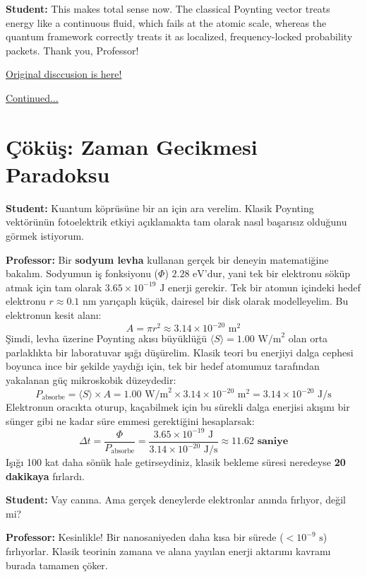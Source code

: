 \documentclass[11pt,a4paper]{article}
\newcommand{\Professor}{\noindent\textbf{\textcolor{profcolor}{Professor:}} }
\newcommand{\Student}{\noindent\textbf{\textcolor{studcolor}{Student:}} }
\begin{document}
	\Student This makes total sense now. The classical Poynting vector treats energy like a continuous fluid, which fails at the atomic scale, whereas the quantum framework correctly treats it as localized, frequency-locked probability packets. Thank you, Professor!
	
	\vspace{12pt}
	\href{https://share.google/aimode/sJ9CGSCIshRXKq8Ur}{Original disccusion is here!}
	
	\href{https://share.google/aimode/TYHMlWbDKYm410deO}{Continued...}
	
	
	
	\section{Çöküş: Zaman Gecikmesi Paradoksu}
	
	\Student Kuantum köprüsüne bir an için ara verelim. Klasik Poynting vektörünün fotoelektrik etkiyi açıklamakta tam olarak nasıl başarısız olduğunu görmek istiyorum. 
	
	\Professor Bir \textbf{sodyum levha} kullanan gerçek bir deneyin matematiğine bakalım. 
	Sodyumun iş fonksiyonu ($\Phi$) $2.28 \text{ eV}$'dur, yani tek bir elektronu söküp atmak için tam olarak $3.65 \times 10^{-19} \text{ J}$ enerji gerekir. Tek bir atomun içindeki hedef elektronu $r \approx 0.1 \text{ nm}$ yarıçaplı küçük, dairesel bir disk olarak modelleyelim. Bu elektronun kesit alanı:
	\begin{equation}
		A = \pi r^2 \approx 3.14 \times 10^{-20} \text{ m}^2
	\end{equation}
	Şimdi, levha üzerine Poynting akısı büyüklüğü $\langle S \rangle = 1.00 \text{ W/m}^2$ olan orta parlaklıkta bir laboratuvar ışığı düşürelim. Klasik teori bu enerjiyi dalga cephesi boyunca ince bir şekilde yaydığı için, tek bir hedef atomumuz tarafından yakalanan güç mikroskobik düzeydedir:
	\begin{equation}
		P_{\text{absorbe}} = \langle S \rangle \times A = 1.00 \text{ W/m}^2 \times 3.14 \times 10^{-20} \text{ m}^2 = 3.14 \times 10^{-20} \text{ J/s}
	\end{equation}
	Elektronun oracıkta oturup, kaçabilmek için bu sürekli dalga enerjisi akışını bir sünger gibi ne kadar süre emmesi gerektiğini hesaplarsak:
	\begin{equation}
		\Delta t = \frac{\Phi}{P_{\text{absorbe}}} = \frac{3.65 \times 10^{-19} \text{ J}}{3.14 \times 10^{-20} \text{ J/s}} \approx \mathbf{11.62 \text{ saniye}}
	\end{equation}
	Işığı 100 kat daha sönük hale getirseydiniz, klasik bekleme süresi neredeyse \textbf{20 dakikaya} fırlardı. 
	
	\Student Vay canına. Ama gerçek deneylerde elektronlar anında fırlıyor, değil mi?
	
	\Professor Kesinlikle! Bir nanosaniyeden daha kısa bir sürede ($< 10^{-9} \text{ s}$) fırlıyorlar. Klasik teorinin zamana ve alana yayılan enerji aktarımı kavramı burada tamamen çöker.
	
	
	
\end{document}
